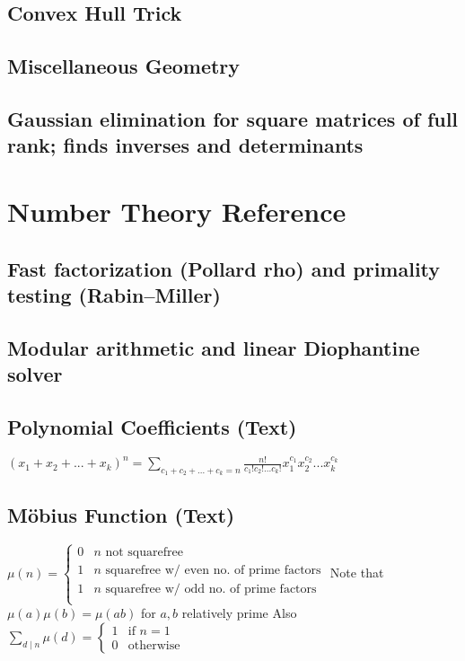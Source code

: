 \documentclass[12pt]{extarticle}
\begin{document}
\begin{multicols*}{2}
\subsection{Convex Hull Trick} %



\subsection{Miscellaneous Geometry} %


\subsection{Gaussian elimination for square matrices of full rank; finds
inverses and determinants} %


\section{Number Theory Reference}

\subsection{Fast factorization (Pollard rho) and primality testing
(Rabin--Miller)} %


\subsection{Modular arithmetic and linear Diophantine solver} %


\subsection{Polynomial Coefficients (Text)} %
$(x_1 + x_2 + ... + x_k)^n = \sum_{c_1 + c_2 + ... + c_k = n}
\frac{n!}{c_1! c_2! ... c_k!} x_1^{c_1} x_2^{c_2} ... x_k^{c_k}$

\subsection{M\"obius Function (Text)} %
$\mu(n) = \begin{cases}
0 & \text{$n$ not squarefree} \\
1 & \text{$n$ squarefree w/ even no. of prime factors} \\
1 & \text{$n$ squarefree w/ odd no. of prime factors} \\
\end{cases}$
Note that $\mu(a) \mu(b) = \mu(ab)$ for $a, b$ relatively prime
Also $\sum_{d \mid n} \mu(d) = \begin{cases} 1 & \text{if $n = 1$} \\
0 & \text{otherwise} \end{cases}$


\end{multicols*}
\end{document}
